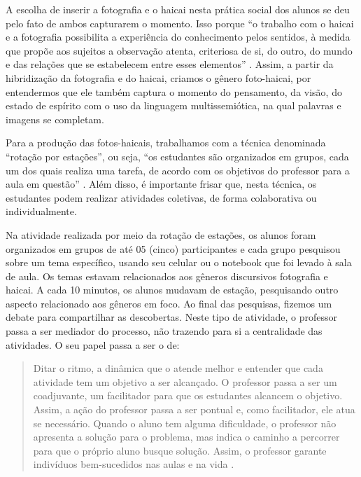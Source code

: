 \documentclass{textolivre}
\begin{document}
A escolha de inserir a fotografia e o haicai nesta prática social dos alunos se deu pelo fato de ambos capturarem o momento. Isso porque “o trabalho com o haicai e a fotografia possibilita a experiência do conhecimento pelos sentidos, à medida que propõe aos sujeitos a observação atenta, criteriosa de si, do outro, do mundo e das relações que se estabelecem entre esses elementos” \cite[p. 30]{dantas2016}. Assim, a partir da hibridização da fotografia e do haicai, criamos o gênero foto-haicai, por entendermos que ele também captura o momento do pensamento, da visão, do estado de espírito com o uso da linguagem multissemiótica, na qual palavras e imagens se completam.

Para a produção das fotos-haicais, trabalhamos com a técnica denominada “rotação por estações”, ou seja, “os estudantes são organizados em grupos, cada um dos quais realiza uma tarefa, de acordo com os objetivos do professor para a aula em questão” \cite[p. 55]{bacich2015}. Além disso, é importante frisar que, nesta técnica, os estudantes podem realizar atividades coletivas, de forma colaborativa ou individualmente.

Na atividade realizada por meio da rotação de estações, os alunos foram organizados em grupos de até 05 (cinco) participantes e cada grupo pesquisou sobre um tema específico, usando seu celular ou o notebook que foi levado à sala de aula. Os temas estavam relacionados aos gêneros discursivos fotografia e haicai. A cada 10 minutos, os alunos mudavam de estação, pesquisando outro aspecto relacionado aos gêneros em foco. Ao final das pesquisas, fizemos um debate para compartilhar as descobertas. Neste tipo de atividade, o professor passa a ser mediador do processo, não trazendo para si a centralidade das atividades. O seu papel passa a ser o de:

\begin{quote}
Ditar o ritmo, a dinâmica que o atende melhor e entender que cada atividade tem um objetivo a ser alcançado. O professor passa a ser um coadjuvante, um facilitador para que os estudantes alcancem o objetivo. Assim, a ação do professor passa a ser pontual e, como facilitador, ele atua se necessário. Quando o aluno tem alguma dificuldade, o professor não apresenta a solução para o problema, mas indica o caminho a percorrer para que o próprio aluno busque solução. Assim, o professor garante indivíduos bem-sucedidos nas aulas e na vida \cite[p. 84]{pires2015}.
\end{quote}
\end{document}
